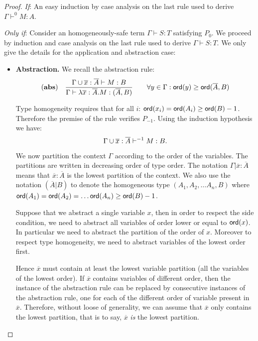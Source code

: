 \begin{proof}
\emph{If}: An easy induction by case analysis on the last rule used to derive $\Gamma \vdash^0 M : A$.

\emph{Only if}:
Consider an homogeneously-safe term $\Gamma \vdash S : T$ satisfying $P_0$.
We proceed by induction and case analysis on the last rule used to derive $\Gamma \vdash S : T$.
We only give the details for the application and abstraction
case:
\begin{itemize}
\item \textbf{Abstraction.} We recall the abstraction rule:
$$ \mathbf{(abs)} \quad  \frac{\displaystyle \Gamma \cup \overline{x} : \overline{A} \vdash M : B}{\Gamma  \vdash \lambda \overline{x} : \overline{A} . M : (\overline{A},B)} \qquad
                                   \forall y \in \Gamma : {\sf ord}(y) \geq {\sf ord}(\overline{A},B)$$

Type homogeneity requires that for all $i$: ${\sf ord}(x_i) = {\sf ord}(A_i) \geq
{\sf ord}(B) -1$. Therefore the premise of the rule verifies $P_{-1}$. Using the induction hypothesis we have:
\begin{equation}
\Gamma \cup \overline{x} : \overline{A} \vdash^{-1} M : B. \label{eq:prop:nonhomogsafe_homog_restriction:abs1}
\end{equation}

We now partition the context $\Gamma$ according to the order of
the variables. The partitions are written in decreasing order of
type order. The notation $\Gamma | \overline{x}:\overline{A}$ means
that $\overline{x}:\overline{A}$ is the lowest partition of the
context.
We also use the notation $(\overline{A}|B)$ to denote the
homogeneous type $(A_1, A_2, \ldots A_n, B)$ where ${\sf ord}(A_1) =
{\sf ord}(A_2) =  \ldots {\sf ord}(A_n) \geq {\sf ord}(B) -1$.


Suppose that we abstract a single variable $x$,
then in order to respect the side condition, we need to abstract all
variables of order lower or equal to ${\sf ord}(x)$. In particular we
need to abstract the partition of the order of $x$.
Moreover to respect type homogeneity, we need to abstract variables
of the lowest order first.

Hence $\overline{x}$ must contain at least the lowest variable partition (all the variables of the lowest order).
If $\overline{x}$ contains variables of different order, then the instance of the abstraction rule can be replaced by consecutive
instances of the abstraction rule, one for each of the different order of variable present in $\overline{x}$.
Therefore, without loose of generality, we can assume that $\overline{x}$ only contains the lowest partition, that is to say,
$\overline{x}$ \emph{is} the lowest partition.


\end{itemize}
\end{proof}
